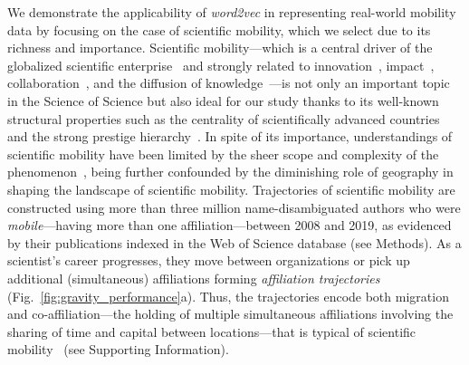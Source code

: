 \documentclass[12pt]{article} %
\def\SI{Supporting Information}
\begin{document}
We demonstrate the applicability of \textit{word2vec} in representing real-world mobility data by focusing on the case of scientific mobility, which we select due to its richness and importance. 
Scientific mobility---which is a central driver of the globalized scientific enterprise~\autocite{czaika2018globalisation, box2008competition} and strongly related to innovation~\autocite{braunerhjelm2020labor, kaiser2018innovation}, impact~\autocite{sugimoto2017mostimpact, petersen2018multiscale}, collaboration~\autocite{rodrigues2016mobility}, and the diffusion of knowledge~\autocite{braunerhjelm2020labor, morgan2018prestige}---is not only an important topic in the Science of Science but also ideal for our study thanks to its well-known structural properties such as the centrality of scientifically advanced countries and the strong prestige hierarchy~\autocite{clauset2015hierarchy, deville2014career}.
In spite of its importance, understandings of scientific mobility have been limited by the sheer scope and complexity of the phenomenon~\autocite{robinson2019mobility, deville2014career}, being further confounded by the diminishing role of geography in shaping the landscape of scientific mobility. Trajectories of scientific mobility are constructed using more than three million name-disambiguated authors who were \textit{mobile}---having more than one affiliation---between 2008 and 2019, as evidenced by their publications indexed in the Web of Science database (see Methods).
As a scientist's career progresses, they move between organizations or pick up additional (simultaneous) affiliations forming \textit{affiliation trajectories} (Fig.~\ref{fig:gravity_performance}a).
Thus, the trajectories encode both migration and co-affiliation---the holding of multiple simultaneous affiliations involving the sharing of time and capital between locations---that is typical of scientific mobility~\autocite{rodrigues2016mobility, sugimoto2017mostimpact} (see \SI).
\end{document}
